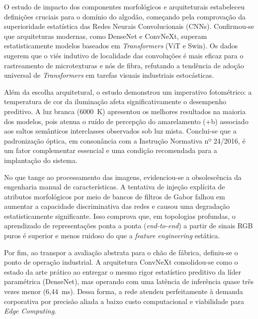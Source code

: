 

O estudo de impacto dos componentes morfológicos e arquiteturais estabeleceu definições cruciais para o domínio do algodão, começando pela comprovação da superioridade estatística das Redes Neurais Convolucionais (CNNs). Confirmou-se que arquiteturas modernas, como DenseNet e ConvNeXt, superam estatisticamente modelos baseados em \textit{Transformers} (ViT e Swin). Os dados sugerem que o viés indutivo de localidade das convoluções é mais eficaz para o rastreamento de microtexturas e nós de fibra, refutando a tendência de adoção universal de \textit{Transformers} em tarefas visuais industriais estocásticas.

Além da escolha arquitetural, o estudo demonstrou um imperativo fotométrico: a temperatura de cor da iluminação afeta significativamente o desempenho preditivo. A luz branca (6000~K) apresentou os melhores resultados na maioria dos modelos, pois atenua o ruído de percepção do amarelamento (+b) associado aos saltos semânticos interclasses observados sob luz mista. Conclui-se que a padronização óptica, em consonância com a Instrução Normativa nº 24/2016, é um fator complementar essencial e uma condição recomendada para a implantação do sistema.

No que tange ao processamento das imagens, evidenciou-se a obsolescência da engenharia manual de características. A tentativa de injeção explícita de atributos morfológicos por meio de bancos de filtros de Gabor falhou em aumentar a capacidade discriminativa das redes e causou uma degradação estatisticamente significante. Isso comprova que, em topologias profundas, o aprendizado de representações ponta a ponta (\textit{end-to-end}) a partir de sinais RGB puros é superior e menos ruidoso do que a \textit{feature engineering} estática.

Por fim, ao transpor a avaliação abstrata para o chão de fábrica, definiu-se o ponto de operação industrial. A arquitetura ConvNeXt consolidou-se como o estado da arte prático ao entregar o mesmo rigor estatístico preditivo da líder paramétrica (DenseNet), mas operando com uma latência de inferência quase três vezes menor (6,44~ms). Dessa forma, a rede atendeu perfeitamente à demanda corporativa por precisão aliada a baixo custo computacional e viabilidade para \textit{Edge Computing}.